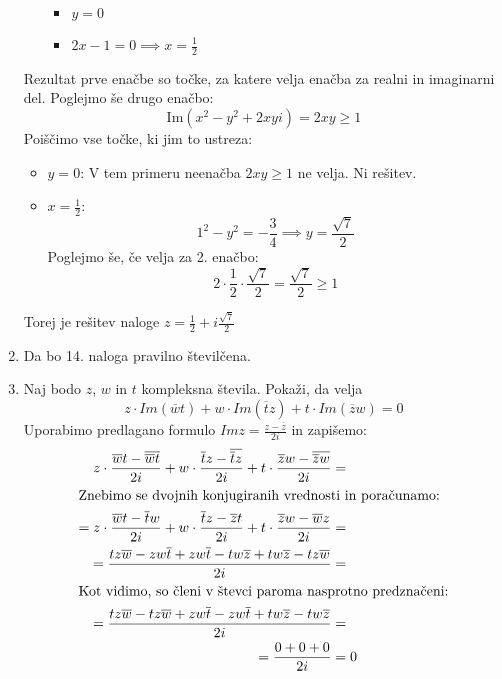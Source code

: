 \documentclass[12pt,a4paper,slovene]{article}
\begin{document}
\begin{enumerate}[(1)]
\begin{itemize}
        \begin{itemize}
            \item $y = 0$
            \item $2x  - 1 = 0 \implies x = \frac{1}{2}$
        \end{itemize}
    \end{itemize}
    Rezultat prve enačbe so točke, za katere velja enačba za realni in imaginarni del. Poglejmo še drugo enačbo:
    \[
    \text{Im}(x^2 - y^2 + 2xyi) = 2xy \geq 1
    \]
    Poiščimo vse točke, ki jim to ustreza:
    \begin{itemize}
        \item $y = 0$: V tem primeru neenačba $2xy \geq 1$ ne velja. Ni rešitev.
        \item $x = \frac{1}{2}$:
        \[
        1^2 - y^2 = -\frac{3}{4} \implies y = \frac{\sqrt{7}}{2}
        \]
        Poglejmo še, če velja za 2. enačbo:
        \[
        2 \cdot \frac{1}{2} \cdot \frac{\sqrt{7}}{2} = \frac{\sqrt{7}}{2} \geq 1
        \]
    \end{itemize}
    Torej je rešitev naloge $z = \frac{1}{2} + i \frac{\sqrt{7}}{2} $

\item
	Da bo 14. naloga pravilno številčena.

\item
Naj bodo $z$, $w$ in $t$ kompleksna števila. Pokaži, da velja 
	\[
    	z\cdot Im(\overline{w}t) + w\cdot Im(\overline{t}z) + t\cdot Im(\overline{z}w) = 0
    \]
    Uporabimo predlagano formulo $Im z = \frac{z-\overline{z}}{2i}$ in zapišemo:
    \begin{align*}
    	z\cdot\frac{\overline{w}t - \overline{\overline{w}t}}{2i} + w\cdot\frac{\overline{t}z - 	\overline{\overline{t}z}}{2i} + t\cdot\frac{\overline{z}w - \overline{\overline{z}w}}{2i} &=  \\
        \intertext{Znebimo se dvojnih konjugiranih vrednosti in poračunamo:}
        =z\cdot\frac{\overline{w}t - \overline{t}w}{2i} + w\cdot\frac{\overline{t}z - \overline{z}t}{2i} + t\cdot\frac{\overline{z}w - \overline{w}z}{2i} &=  \\
        =\frac{tz\overline{w} - zw\overline{t} + zw\overline{t} - tw\overline{z} + tw\overline{z} - tz\overline{w}}{2i} &=  \\
        \intertext{Kot vidimo, so členi v števci paroma nasprotno predznačeni:}
        =\frac{tz\overline{w} - tz\overline{w} + zw\overline{t} - zw\overline{t} + tw\overline{z} - tw\overline{z}}{2i} &=  \\
        =\frac{0+0+0}{2i} &= 0
    \end{align*}
\end{enumerate}
\end{document}

